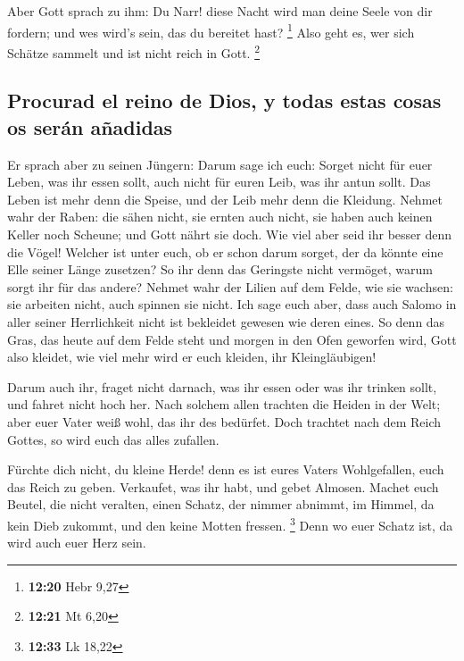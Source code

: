  Aber Gott sprach zu ihm: Du Narr! diese Nacht wird man
deine Seele von dir fordern; und wes wird's sein, das du bereitet hast?
\footnote{\textbf{12:20} Hebr 9,27}  Also geht es, wer
sich Schätze sammelt und ist nicht reich in Gott. \footnote{\textbf{12:21}
  Mt 6,20}

\hypertarget{procurad-el-reino-de-dios-y-todas-estas-cosas-os-seruxe1n-auxf1adidas}{%
\subsection{Procurad el reino de Dios, y todas estas cosas os serán
añadidas}\label{procurad-el-reino-de-dios-y-todas-estas-cosas-os-seruxe1n-auxf1adidas}}

 Er sprach aber zu seinen Jüngern: Darum sage ich euch:
Sorget nicht für euer Leben, was ihr essen sollt, auch nicht für euren
Leib, was ihr antun sollt.  Das Leben ist mehr denn die
Speise, und der Leib mehr denn die Kleidung.  Nehmet wahr
der Raben: die sähen nicht, sie ernten auch nicht, sie haben auch keinen
Keller noch Scheune; und Gott nährt sie doch. Wie viel aber seid ihr
besser denn die Vögel!  Welcher ist unter euch, ob er
schon darum sorget, der da könnte eine Elle seiner Länge zusetzen?
 So ihr denn das Geringste nicht vermöget, warum sorgt
ihr für das andere?  Nehmet wahr der Lilien auf dem
Felde, wie sie wachsen: sie arbeiten nicht, auch spinnen sie nicht. Ich
sage euch aber, dass auch Salomo in aller seiner Herrlichkeit nicht ist
bekleidet gewesen wie deren eines.  So denn das Gras, das
heute auf dem Felde steht und morgen in den Ofen geworfen wird, Gott
also kleidet, wie viel mehr wird er euch kleiden, ihr Kleingläubigen!

 Darum auch ihr, fraget nicht darnach, was ihr essen oder
was ihr trinken sollt, und fahret nicht hoch her.  Nach
solchem allen trachten die Heiden in der Welt; aber euer Vater weiß
wohl, das ihr des bedürfet.  Doch trachtet nach dem Reich
Gottes, so wird euch das alles zufallen.

 Fürchte dich nicht, du kleine Herde! denn es ist eures
Vaters Wohlgefallen, euch das Reich zu geben.  Verkaufet,
was ihr habt, und gebet Almosen. Machet euch Beutel, die nicht veralten,
einen Schatz, der nimmer abnimmt, im Himmel, da kein Dieb zukommt, und
den keine Motten fressen. \footnote{\textbf{12:33} Lk 18,22}
 Denn wo euer Schatz ist, da wird auch euer Herz sein.

